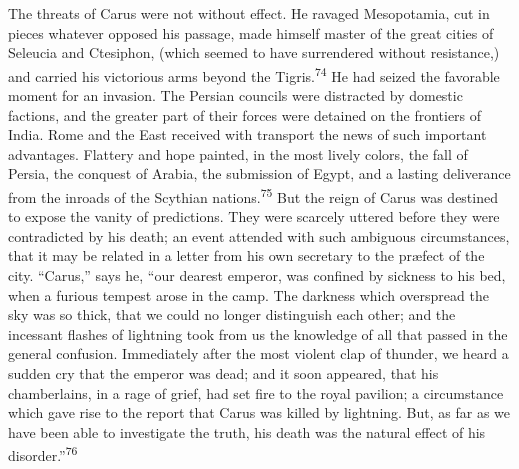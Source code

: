 
The threats of Carus were not without effect. He ravaged
Mesopotamia, cut in pieces whatever opposed his passage, made
himself master of the great cities of Seleucia and Ctesiphon,
(which seemed to have surrendered without resistance,) and
carried his victorious arms beyond the Tigris.\textsuperscript{74} He had seized
the favorable moment for an invasion. The Persian councils were
distracted by domestic factions, and the greater part of their
forces were detained on the frontiers of India. Rome and the East
received with transport the news of such important advantages.
Flattery and hope painted, in the most lively colors, the fall of
Persia, the conquest of Arabia, the submission of Egypt, and a
lasting deliverance from the inroads of the Scythian nations.\textsuperscript{75}
But the reign of Carus was destined to expose the vanity of
predictions. They were scarcely uttered before they were
contradicted by his death; an event attended with such ambiguous
circumstances, that it may be related in a letter from his own
secretary to the præfect of the city. “Carus,” says he, “our
dearest emperor, was confined by sickness to his bed, when a
furious tempest arose in the camp. The darkness which overspread
the sky was so thick, that we could no longer distinguish each
other; and the incessant flashes of lightning took from us the
knowledge of all that passed in the general confusion.
Immediately after the most violent clap of thunder, we heard a
sudden cry that the emperor was dead; and it soon appeared, that
his chamberlains, in a rage of grief, had set fire to the royal
pavilion; a circumstance which gave rise to the report that Carus
was killed by lightning. But, as far as we have been able to
investigate the truth, his death was the natural effect of his
disorder.”\textsuperscript{76}


